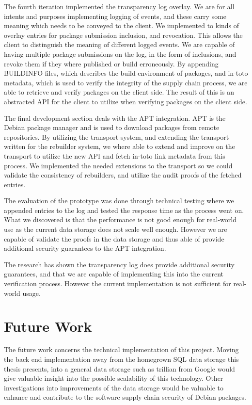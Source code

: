 \documentclass[../Main/thesis.tex]{subfiles}
\begin{document}
The fourth iteration implemented the transparency log overlay. We are for all
intents and purposes implementing logging of events, and these carry some
meaning which needs to be conveyed to the client. We implemented to kinds of
overlay entries for package submission inclusion, and revocation. This allows
the client to distinguish the meaning of different logged events. We are capable
of having multiple package submissions on the log, in the form of inclusions,
and revoke them if they where published or build erroneously. By appending
BUILDINFO files, which describes the build environment of packages, and in-toto
metadata, which is used to verify the integrity of the supply chain process, we
are able to retrieve and verify packages on the client side.  The result of this
is an abstracted API for the client to utilize when verifying packages on the
client side.

The final development section deals with the APT integration. APT is the Debian
package manager and is used to download packages from remote repositories. By
utilizing the transport system, and extending the transport written for the
rebuilder system, we where able to extend and improve on the transport to
utilize the new API and fetch in-toto link metadata from this process. We
implemented the needed extensions to the transport so we could validate the
consistency of rebuilders, and utilize the audit proofs of the fetched entries.

The evaluation of the prototype was done through technical testing where we
appended entries to the log and tested the response time as the process went on.
What we discovered is that the performance is not good enough for real-world use
as the current data storage does not scale well enough. However we are capable
of validate the proofs in the data storage and thus able of provide additional
security guarantees to the APT integration.

The research has shown the transparency log does provide additional security
guarantees, and that we are capable of implementing this into the current
verification process. However the current implementation is not sufficient for
real-world usage.

\section{Future Work}%
\label{sec:future_work}
The future work concerns the technical implementation of this project.
Moving the back end implementation away from the homegrown SQL data storage this
thesis presents, into a general data storage such as trillian from Google would
give valuable insight into the possible scalability of this technology. Other
investigations into improvements of the data storage would be valuable to
enhance and contribute to the software supply chain security of Debian packages.
\end{document}
